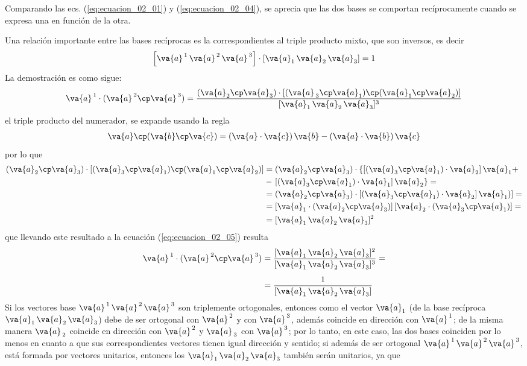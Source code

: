 Comparando las ecs. (\ref{eq:ecuacion_02_01}) y (\ref{eq:ecuacion_02_04}), se aprecia que las dos bases se comportan recíprocamente cuando se expresa una en función de la otra.
\par
Una relación importante entre las bases recíprocas es la correspondientes al triple producto mixto, que son inversos, es decir
\begin{align*}
\left[ \va{a}^{\, 1} \, \va{a}^{\, 2} \, \va{a}^{\, 3} \right] \cdot \left[ \va{a}_{1} \, \va{a}_{2} \, \va{a}_{3} \right]
= 1
\end{align*}
La demostración es como sigue:
\begin{align}
\va{a}^{\, 1} \cdot (\va{a}^{\, 2} \cp \va{a}^{\, 3}) = \dfrac{(\va{a}_{2} \cp \va{a}_{3}) \cdot [(\va{a}_{\, 3} \cp \va{a}_{1}) \cp (\va{a}_{1} \cp \va{a}_{2})]}{[ \va{a}_{1} \, \va{a}_{2} \, \va{a}_{3}]^{3}}
\label{eq:ecuacion_02_05}
\end{align}
el triple producto del numerador, se expande usando la regla
\begin{align*}
\va{a} \cp (\va{b} \cp \va{c}) = (\va{a} \cdot \va{c}) \, \va{b} - (\va{a} \cdot \va{b}) \, \va{c}
\end{align*}
por lo que
\begin{align*}
(\va{a}_{2} \cp \va{a}_{3}) \cdot [(\va{a}_{3} \cp \va{a}_{1}) \cp (\va{a}_{1} \cp \va{a}_{2})] &= (\va{a}_{2} \cp \va{a}_{3}) \cdot \left\{ [(\va{a}_{3} \cp \va{a}_{1}) \cdot \va{a}_{2}] \, \va{a}_{1} + \right. \\
&- \left. [(\va{a}_{3} \cp \va{a}_{1}) \cdot \va{a}_{1}] \, \va{a}_{2} \right\} = \\
&= (\va{a}_{2} \cp \va{a}_{3}) \cdot [(\va{a}_{3} \cp \va{a}_{1}) \cdot \va{a}_{2} ] \, \va{a}_{1})] = \\
&= [\va{a}_{1} \cdot (\va{a}_{2} \cp \va{a}_{3})] \, [\va{a}_{2} \cdot (\va{a}_{3} \cp \va{a}_{1})] = \\
&= [ \va{a}_{1} \, \va{a}_{2} \, \va{a}_{3}]^{2}
\end{align*}
que llevando este resultado a la ecuación (\ref{eq:ecuacion_02_05}) resulta
\begin{align*}
\va{a}^{\, 1} \cdot (\va{a}^{\, 2} \cp \va{a}^{\, 3}) &= \dfrac{[ \va{a}_{1} \, \va{a}_{2} \, \va{a}_{3}]^{2}}{[ \va{a}_{1} \, \va{a}_{2} \, \va{a}_{3}]^{3}} = \\[0.5em]
&= \dfrac{1}{[ \va{a}_{1} \, \va{a}_{2} \, \va{a}_{3}]}
\end{align*}
Si los vectores base $ \va{a}^{\, 1} \, \va{a}^{\, 2} \, \va{a}^{\, 3}$ son triplemente ortogonales, entonces como el vector $\va{a}_{1}$ (de la base recíproca $\va{a}_{1} \, \va{a}_{2} \, \va{a}_{3}$) debe de ser ortogonal con $\va{a}^{\, 2}$ y con $\va{a}^{\, 3}$, además coincide en dirección con $\va{a}^{\, 1}$; de la misma manera $\va{a}_{\, 2}$ coincide en dirección con $\va{a}^{\, 2}$ y $\va{a}_{\, 3}$ con $\va{a}^{\, 3}$; por lo tanto, en este caso, las dos bases coinciden por lo menos en cuanto a que sus correspondientes vectores tienen igual dirección y sentido; si además de ser ortogonal $ \va{a}^{\, 1} \, \va{a}^{\, 2} \, \va{a}^{\, 3}$, está formada por vectores unitarios, entonces los $\va{a}_{1} \, \va{a}_{2} \, \va{a}_{3}$ también serán unitarios, ya que 
